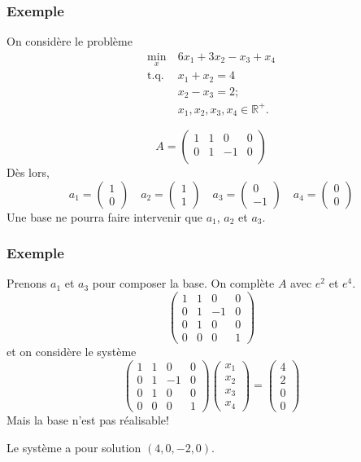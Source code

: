 \documentclass[t,usepdftitle=false]{beamer}
\def\RR{\mathbb{R}}
\begin{document}
\begin{frame}
\frametitle{Exemple}

On considère le problème
\begin{align*}
\min_x \ & 6x_1 + 3x_2 - x_3 + x_4 \\
\mbox{t.q. } & x_1 + x_2 = 4 \\
& x_2 - x_3 = 2; \\
& x_1, x_2, x_3, x_4 \in \RR^+.
\end{align*}

\mbox{}

\[
A = \begin{pmatrix}
1 & 1 & 0 & 0 \\
0 & 1 & -1 & 0 \\
\end{pmatrix}
\]
Dès lors,
\[
a_1 = \begin{pmatrix} 1 \\ 0 \end{pmatrix}
\quad
a_2 = \begin{pmatrix} 1 \\ 1 \end{pmatrix}
\quad
a_3 = \begin{pmatrix} 0 \\ -1 \end{pmatrix}
\quad
a_4 = \begin{pmatrix} 0 \\ 0 \end{pmatrix}
\]
Une base ne pourra faire intervenir que $a_1$, $a_2$ et $a_3$.

\end{frame}

\begin{frame}
\frametitle{Exemple}

Prenons $a_1$ et $a_3$ pour composer la base. On complète $A$ avec $e^2$ et $e^4$.
\[
\begin{pmatrix}
1 & 1 & 0 & 0 \\
0 & 1 & -1 & 0 \\
0 & 1 & 0 & 0 \\
0 & 0 & 0 & 1
\end{pmatrix}
\]
et on considère le système
\[
\begin{pmatrix}
1 & 1 & 0 & 0 \\
0 & 1 & -1 & 0 \\
0 & 1 & 0 & 0 \\
0 & 0 & 0 & 1
\end{pmatrix}
\begin{pmatrix}
x_1 \\ x_2 \\ x_3 \\ x_4
\end{pmatrix}
=
\begin{pmatrix}
4 \\ 2 \\ 0 \\ 0
\end{pmatrix}
\]
Mais la base n'est pas réalisable!

Le système a pour solution $(4, 0, -2, 0)$.
\end{frame}
\end{document}
